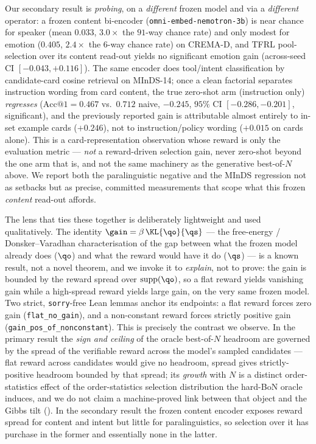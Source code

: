 Our secondary result is \emph{probing}, on a \emph{different} frozen model and via a \emph{different}
operator: a frozen content bi-encoder (\texttt{omni-embed-nemotron-3b}) is near chance for speaker
(mean $0.033$, $3.0\times$ the $91$-way chance rate) and only modest for emotion ($0.405$, $2.4\times$
the $6$-way chance rate) on CREMA-D, and TFRL pool-selection over its content read-out yields
no significant emotion gain (across-seed CI $[-0.043,+0.116]$). The same encoder does tool/intent
classification by candidate-card cosine retrieval on MInDS-14; once a clean factorial separates
instruction wording from card content, the true zero-shot arm (instruction only) \emph{regresses}
($\mathrm{Acc@1}=0.467$ vs.\ $0.712$ naive, $-0.245$, $95\%$ CI $[-0.286,-0.201]$, significant), and the
previously reported gain is attributable almost entirely to in-set example cards ($+0.246$), not to
instruction/policy wording ($+0.015$ on cards alone). This is a card-representation observation whose
reward is only the evaluation metric --- \emph{not} a reward-driven selection gain, never zero-shot
beyond the one arm that is, and not the same machinery as the generative best-of-$N$ above. We report
both the paralinguistic negative and the MInDS regression not as setbacks but as precise, committed
measurements that scope what this frozen \emph{content} read-out affords.

The lens that ties these together is deliberately lightweight and used qualitatively. The identity
$\gain=\beta\,\KL{\qo}{\qs}$ --- the free-energy / Donsker--Varadhan characterisation of the gap between
what the frozen model already does ($\qo$) and what the reward would have it do ($\qs$) --- is a known
result, not a novel theorem, and we invoke it to \emph{explain}, not to prove: the gain is bounded by
the reward spread over $\mathrm{supp}(\qo)$, so a flat reward yields vanishing gain while a high-spread
reward yields large gain, on the very same frozen model. Two strict, \texttt{sorry}-free Lean lemmas
anchor its endpoints: a flat reward forces zero gain (\texttt{flat\_no\_gain}), and a non-constant
reward forces strictly positive gain (\texttt{gain\_pos\_of\_nonconstant}). This is precisely the
contrast we observe. In the primary result the \emph{sign and ceiling} of the oracle best-of-$N$ headroom are governed by the
spread of the verifiable reward across the model's sampled candidates --- flat reward across candidates
would give no headroom, spread gives strictly-positive headroom bounded by that spread; its \emph{growth}
with $N$ is a distinct order-statistics effect of the order-statistics selection distribution the
hard-BoN oracle induces, and we do not claim a machine-proved link between that object and the Gibbs
tilt (). In the secondary result the
frozen content encoder exposes reward spread for content and intent but little for paralinguistics, so
selection over it has purchase in the former and essentially none in the latter.

